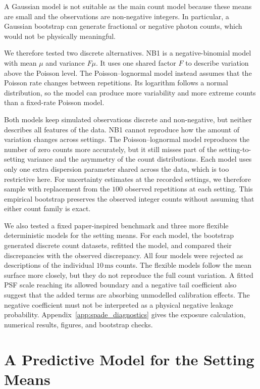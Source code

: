 A Gaussian model is not suitable as the main count model because these means are small and the observations are non-negative integers.  In particular, a Gaussian bootstrap can generate fractional or negative photon counts, which would not be physically meaningful.

We therefore tested two discrete alternatives.  NB1 is a negative-binomial model with mean $\mu$ and variance $F \mu$.  It uses one shared factor $F$ to describe variation above the Poisson level.  The Poisson--lognormal model instead assumes that the Poisson rate changes between repetitions.  Its logarithm follows a normal distribution, so the model can produce more variability and more extreme counts than a fixed-rate Poisson model.

Both models keep simulated observations discrete and non-negative, but neither describes all features of the data.  NB1 cannot reproduce how the amount of variation changes across settings.  The Poisson--lognormal model reproduces the number of zero counts more accurately, but it still misses part of the setting-to-setting variance and the asymmetry of the count distributions.  Each model uses only one extra dispersion parameter shared across the data, which is too restrictive here.  For uncertainty estimates at the recorded settings, we therefore sample with replacement from the $100$ observed repetitions at each setting.  This empirical bootstrap preserves the observed integer counts without assuming that either count family is exact.

We also tested a fixed paper-inspired benchmark and three more flexible deterministic models for the setting means.  For each model, the bootstrap generated discrete count datasets, refitted the model, and compared their discrepancies with the observed discrepancy.  All four models were rejected as descriptions of the individual $10\,\mathrm{ms}$ counts.  The flexible models follow the mean surface more closely, but they do not reproduce the full count variation.  A fitted PSF scale reaching its allowed boundary and a negative tail coefficient also suggest that the added terms are absorbing unmodelled calibration effects.  The negative coefficient must not be interpreted as a physical negative leakage probability.  Appendix~\ref{app:spade_diagnostics} gives the exposure calculation, numerical results, figures, and bootstrap checks.

\section{A Predictive Model for the Setting Means}
\label{sec:spade_conditional_inference}

